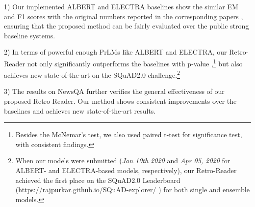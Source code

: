 \documentclass[letterpaper]{article} \usepackage{aaai21}  \usepackage{times}  \usepackage{helvet} \usepackage{courier}  \usepackage[hyphens]{url}  \usepackage{graphicx}
\begin{document}
1) Our implemented ALBERT and ELECTRA baselines show the similar EM and F1 scores with the original numbers reported in the corresponding papers \cite{Lan2020ALBERT,clark2019electra}, ensuring that the proposed method can be fairly evaluated over the public strong baseline systems.

2) In terms of powerful enough PrLMs like ALBERT and ELECTRA, our Retro-Reader not only significantly outperforms the baselines with p-value ,\footnote{Besides the McNemar's test, we also used paired t-test for significance test, with consistent findings.} but also achieves new state-of-the-art on the SQuAD2.0 challenge.\footnote{When our models were submitted (\textit{Jan 10th 2020} and \textit{Apr 05, 2020} for ALBERT- and ELECTRA-based models, respectively), our Retro-Reader achieved the first place on the SQuAD2.0 Leaderboard (https://rajpurkar.github.io/SQuAD-explorer/ ) for both single and ensemble models.}

3) The results on NewsQA further verifies the general
effectiveness of our proposed Retro-Reader. Our method shows consistent improvements over the baselines and achieves new state-of-the-art results.
\end{document}
